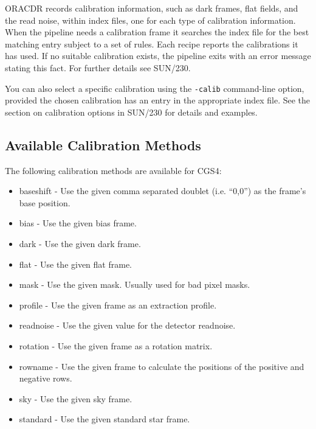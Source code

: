 \documentclass[twoside,11pt]{article}
\newenvironment{latexonly}{}{}
\newcommand{\xref}[3]{#1}
\renewcommand{\_}{\texttt{\symbol{95}}}
\begin{document}
ORACDR records calibration information, such as dark frames, flat
fields, and the read noise, within index files, one for each type of
calibration information.  When the pipeline needs a calibration frame
it searches the index file for the best matching entry subject to a
set of rules. Each recipe reports the calibrations it has used.  If no
suitable calibration exists, the pipeline exits with an error message
stating this fact.  For further details see
\xref{SUN/230}{sun230}{calibration_selection}.

You can also select a specific calibration using the {\tt -calib}
command-line option, provided the chosen calibration has an entry
in the appropriate index file.  See
\begin{latexonly}
the section on
\end{latexonly}
\xref{calibration options}{sun230}{calibration_options}
\begin{latexonly}
in SUN/230
\end{latexonly}
for details and examples.

\subsection{Available Calibration Methods}

The following calibration methods are available for CGS4:

\begin{itemize}

\item baseshift - Use the given comma separated doublet (i.e. ``0,0'') as the
frame's base position.

\item bias - Use the given bias frame.

\item dark - Use the given dark frame.

\item flat - Use the given flat frame.

\item mask - Use the given mask. Usually used for bad pixel masks.

\item profile - Use the given frame as an extraction profile.

\item readnoise - Use the given value for the detector readnoise.

\item rotation - Use the given frame as a rotation matrix.

\item rowname - Use the given frame to calculate the positions of the positive
and negative rows.

\item sky - Use the given sky frame.

\item standard - Use the given standard star frame.

\end{itemize}

\end{document}
